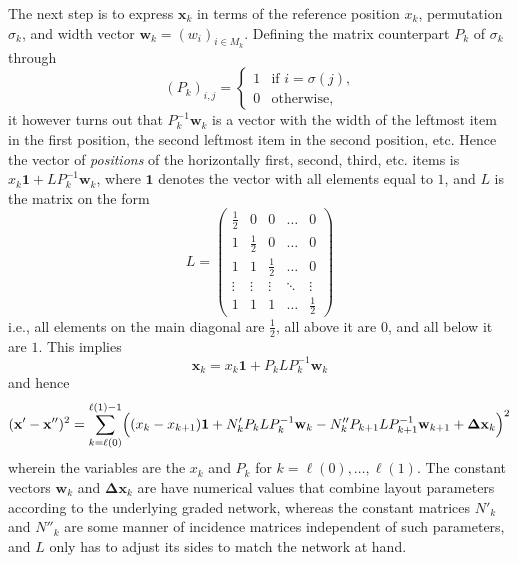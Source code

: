 \documentclass{article}
\newcommand{\vek}{\mathbf}
\theoremstyle{definition}
\begin{document}
The next step is to express $\vek{x}_k$ in terms of the reference 
position $x_k$, permutation $\sigma_k$, and width vector \(\vek{w}_k 
= (w_i)_{i \in M_k}\). Defining the matrix counterpart $P_k$ of 
$\sigma_k$ through
\begin{equation}
  (P_k)_{i,j} = \begin{cases}
    1& \text{if \(i = \sigma(j)\),}\\
    0& \text{otherwise,}
  \end{cases}
\end{equation}
it however turns out that $P_k^{-1} \vek{w}_k$ is a vector with the 
width of the leftmost item in the first position, the second leftmost 
item in the second position, etc. Hence the vector of \emph{positions} 
of the horizontally first, second, third, etc. items is $x_k\vek{1} + 
L P_k^{-1} \vek{w}_k$, where $\vek{1}$ denotes the vector with all 
elements equal to $1$, and $L$ is the matrix on the form
\begin{equation}
  L = \begin{pmatrix}
    \frac{1}{2} & 0 & 0 & \ldots & 0 \\
    1 & \frac{1}{2} & 0 & \ldots & 0 \\
    1 & 1 & \frac{1}{2} & \ldots & 0 \\
    \vdots& \vdots& \vdots& \ddots& \vdots \\
    1 & 1 & 1 & \ldots & \frac{1}{2}
  \end{pmatrix}
\end{equation}
i.e., all elements on the main diagonal are $\frac{1}{2}$, all above 
it are $0$, and all below it are $1$. This implies
\begin{equation}
  \vek{x}_k = x_k \vek{1} + P_k L P_k^{-1} \vek{w}_k
\end{equation}
and hence
\begin{equation} \label{Eq3:Malfunktion}
  (\vek{x}' - \vek{x}'')^2 = \sum_{k=\ell(0)}^{\ell(1)-1} 
  \Bigl( (x_k-x_{k+1})\vek{1} + N'_k P_k L P_k^{-1} \vek{w}_k 
    - N''_k P_{k+1} L P_{k+1}^{-1} \vek{w}_{k+1} + \vek{\Delta x}_k
  \Bigr)^2
\end{equation}
wherein the variables are the $x_k$ and $P_k$ for 
\(k=\ell(0),\dotsc,\ell(1)\). The constant vectors $\vek{w}_k$ and 
$\vek{\Delta x}_k$ are have numerical values that combine layout 
parameters according to the underlying graded network, whereas the 
constant matrices $N'_k$ and $N''_k$ are some manner of incidence 
matrices independent of such parameters, and $L$ only has to adjust 
its sides to match the network at hand.
\end{document}
